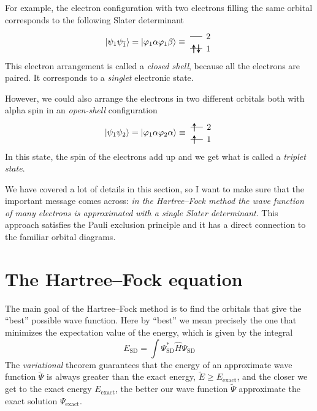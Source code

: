 \documentclass[../Main/chem371-notes.tex]{subfiles}
\begin{document}
For example, the electron configuration with two electrons filling the same orbital corresponds to the following Slater determinant\begin{equation}
\ket{\psi_1 \psi_{\bar{1}}} = 
\ket{\varphi_1 \alpha \varphi_1 \beta }
\equiv \;
\begin{tikzpicture}[baseline={([yshift=-.5ex]current bounding box.center)},]
    \draw (0,0.5) -- (0.5,0.5);
    \draw[thick,->,>=stealth] (0.15,0.325) -- (0.15,0.675);    
    \draw[thick,<-,>=stealth] (0.35,0.325) -- (0.35,0.675);    
    \draw (0,1.0) -- (0.5,1.0);
    \draw (0.75,0.5) node{1};
    \draw (0.75,1.0) node{2};
\end{tikzpicture}
\end{equation}
This electron arrangement is called a \emph{closed shell}, because all the electrons are paired. It corresponds to a \emph{singlet} electronic state.

However, we could also arrange the electrons in two different orbitals both with alpha spin in an \emph{open-shell} configuration
\begin{equation}
\ket{\psi_1 \psi_2}= 
\ket{\varphi_1 \alpha \varphi_2\alpha}
\equiv \;
\begin{tikzpicture}[baseline={([yshift=-.5ex]current bounding box.center)},]
    \draw (0,0.5) -- (0.5,0.5);
    \draw[thick,->,>=stealth] (0.15,0.325) -- (0.15,0.675);    
    \draw[thick,->,>=stealth] (0.15,0.825) -- (0.15,1.175);        
    \draw (0,1.0) -- (0.5,1.0);
    \draw (0.75,0.5) node{1};
    \draw (0.75,1.0) node{2};
\end{tikzpicture}
\end{equation}
In this state, the spin of the electrons add up and we get what is called a \emph{triplet state}.

We have covered a lot of details in this section, so I want to make sure that the important message comes across: \emph{in the Hartree--Fock method the wave function of many electrons is approximated with a single Slater determinant}.
This approach satisfies the Pauli exclusion principle and it has a direct connection to the familiar orbital diagrams.

\section{The Hartree--Fock equation}
The main goal of the Hartree--Fock method is to find the orbitals that give the ``best'' possible wave function.
Here by ``best'' we mean precisely the one that minimizes the expectation value of the energy, which is given by the integral
\begin{equation}
E_\mathrm{SD} = \int \Psi_{\mathrm{SD}}^* \hat{H}\Psi_{\mathrm{SD}}
\end{equation}
The \emph{variational} theorem guarantees that the energy of an approximate wave function $\tilde{\Psi}$ is always greater than the exact energy, $\tilde{E} \geq E_\mathrm{exact}$, and the closer we get to the exact energy $E_\mathrm{exact}$, the better our wave function $\tilde{\Psi}$ approximate the exact solution $\Psi_\mathrm{exact}$.
\end{document}
